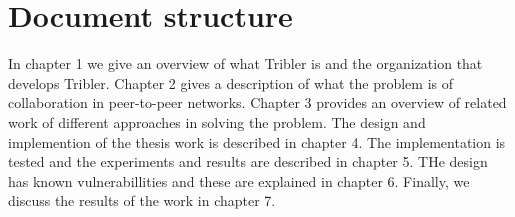 \section{Document structure}
In chapter 1 we give an overview of what Tribler is and the organization that develops Tribler.
Chapter 2 gives a description of what the problem is of collaboration in peer-to-peer networks.
Chapter 3 provides an overview of related work of different approaches in solving the problem.
The design and implemention of the thesis work is described in chapter 4.
The implementation is tested and the experiments and results are described in chapter 5.
THe design has known vulnerabillities and these are explained in chapter 6.
Finally, we discuss the results of the work in chapter 7.
